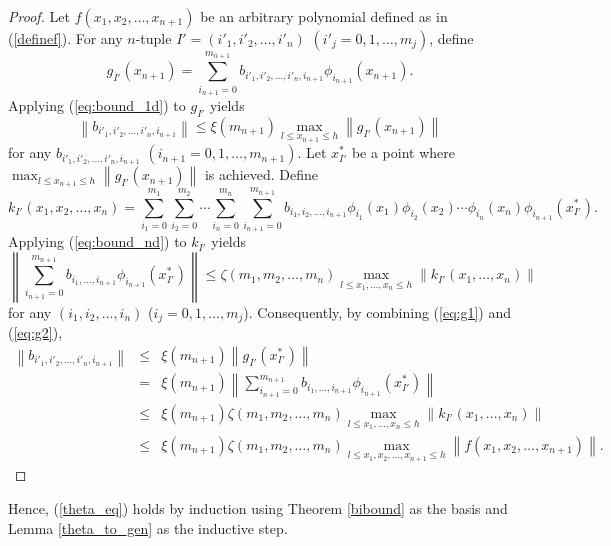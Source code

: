 \documentclass{article}
\newcommand{\norm}[1]{\left\|#1\right\|} \newcommand{\norma}[1]{\left\|#1\right\|}   \newcommand{\inv}[1]{#1^{-1}}
\begin{document}
\begin{proof}
Let $f(x_1,x_2,\ldots,x_{n+1})$ be an arbitrary polynomial defined as in (\ref{definef}).  For any $n$-tuple $I' = (i'_1, i'_2, \ldots, i'_n)$ $(i'_j = 0, 1, \ldots, m_j)$, define 
\[
g_{I'}(x_{n+1}) = \sum_{i_{n+1}=0}^{m_{n+1}} b_{i'_1, i'_2, \ldots, i'_n, i_{n+1}} \phi_{i_{n+1}}(x_{n+1}).
\]
Applying (\ref{eq:bound_1d}) to $g_{I'}$ yields
\begin{equation}
\label{eq:g1}
\norm{ b_{i'_1, i'_2, \ldots, i'_n, i_{n+1}}} \leq \xi(m_{n+1}) \max_{l \leq x_{n+1} \leq h} \norm { g_{I'}(x_{n+1})}
\end{equation}
for any $b_{i'_1, i'_2, \ldots, i'_n, i_{n+1}}$ $(i_{n+1}= 0, 1, \ldots, m_{n+1})$.  Let $x^*_{I'}$ be a point where $\max_{l \leq x_{n+1} \leq h} \norm { g_{I'}(x_{n+1})}$ is achieved.  Define 
\[
k_{I'}(x_1, x_2, \ldots, x_n) = \sum_{i_1=0}^{m_1} \sum_{i_2 = 0}^{m_2} \cdots \sum_{i_n=0}^{m_n}\sum_{i_{n+1}=0}^{m_{n+1}} b_{i_1, i_2, \ldots, i_{n+1}} \phi_{i_1}(x_1) \phi_{i_2}(x_2) \cdots \phi_{i_n}(x_n) \phi_{i_{n+1}}(x^*_{I'}).
\]
Applying (\ref{eq:bound_nd}) to $k_{I'}$ yields
\begin{equation}
\label{eq:g2}
\norm{\sum_{i_{n+1}=0}^{m_{n+1}} b_{i_1, \ldots, i_{n+1}} \phi_{i_{n+1}}(x^*_{I'})} \leq \zeta(m_1, m_2,\ldots,m_n) \max_{l \leq x_1, \ldots, x_n \leq h} \norm{ k_{I'}(x_1, \ldots, x_n)}
\end{equation}
for any $(i_1, i_2, \ldots, i_n)$ ($i_j = 0, 1, \ldots, m_j$).  Consequently, by combining (\ref{eq:g1}) and (\ref{eq:g2}),
\begin{eqnarray*}
\norm{ b_{i'_1, i'_2, \ldots, i'_n, i_{n+1}}} &\leq & \xi(m_{n+1}) \norm { g_{I'}(x^*_{I'})} \\
& = & \xi(m_{n+1})\norm{\sum_{i_{n+1}=0}^{m_{n+1}} b_{i_1, \ldots, i_{n+1}} \phi_{i_{n+1}}(x^*_{I'})} \\
& \leq & \xi(m_{n+1})\zeta(m_1, m_2,\ldots,m_n) \max_{l \leq x_1, \ldots, x_n \leq h} \norm{ k_{I'}(x_1, \ldots, x_n)} \\
& \leq & \xi(m_{n+1})\zeta(m_1, m_2, \ldots, m_n) \max_{l \leq x_1, x_2, \ldots, x_{n+1} \leq h}
\norm{f(x_1, x_2, \ldots, x_{n+1})}.
\end{eqnarray*}
\end{proof}

Hence, (\ref{theta_eq}) holds by induction using Theorem \ref{bibound} as the basis and Lemma \ref{theta_to_gen} as the inductive step.
\end{document}
